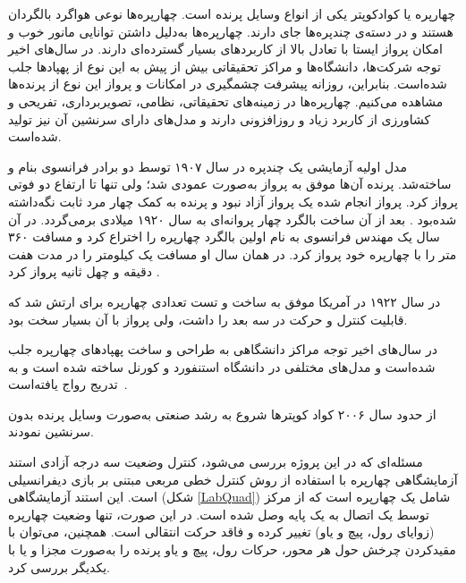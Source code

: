 


چهارپره یا کوادکوپتر یکی از انواع وسایل پرنده است. چهارپره‌ها نوعی هواگرد بالگردان هستند و در دسته‌ی چندپره‌ها جای دارند.
  چهارپره‌ها به‌دلیل داشتن توانایی مانور خوب و امکان پرواز ایستا با تعادل بالا از کاربردهای بسیار گسترده‌ای دارند.
در سال‌های اخیر توجه شرکت‌ها، دانشگاه‌ها و مراکز تحقیقاتی بیش از پیش به این نوع از پهپادها جلب شده‌است. بنابراین، روزانه پیشرفت چشمگیری
 در امکانات و پرواز این نوع از پرنده‌ها مشاهده می‌کنیم. چهارپره‌ها در زمینه‌های تحقیقاتی، نظامی، تصویربرداری، تفریحی و کشاورزی از کاربرد زیاد و روزافزونی دارند و مدل‌های دارای سرنشین آن نیز تولید شده‌است‌.





مدل‬ اولیه آزمایشی یک چندپره در سال ۱۹۰۷ توسط دو برادر فرانسوی بنام
  و 
  ساخته‌شد. پرنده آن‌ها موفق به پرواز به‌صورت عمودی شد؛ ولی تنها تا ارتفاع دو فوتی پرواز کرد. پرواز انجام شده یک پرواز آزاد
  نبود و پرنده به کمک چهار مرد ثابت نگه‌داشته شده‌بود \cite{Sprekelmeyer}.
  بعد از آن ساخت بالگرد چهار پروانه‌ای به سال ۱۹۲۰ میلادی برمی‌گردد. در آن سال یک مهندس فرانسوی به نام  اولین بالگرد چهارپره را اختراع کرد و مسافت ۳۶۰ متر را با چهارپره خود پرواز کرد. در همان سال او مسافت یک کیلومتر را در مدت هفت دقیقه و چهل ثانیه پرواز کرد \cite{10.2307/44729509}.

در  سال ۱۹۲۲ در آمریکا  موفق به ساخت و تست تعدادی چهارپره برای ارتش شد که قابلیت کنترل و حرکت در سه بعد را داشت، ولی پرواز با آن بسیار سخت بود.

در سال‌های اخیر توجه مراکز دانشگاهی به طراحی و ساخت پهپادهای چهارپره جلب شده‌است و مدل‌های مختلفی در دانشگاه استنفورد و کورنل ساخته شده است و به تدریج رواج یافته‌است~\cite{5717652}.

از حدود سال ۲۰۰۶ کواد کوپترها شروع به رشد صنعتی به‌صورت وسایل پرنده بدون سرنشین نمودند.


مسئله‌ای که در این پروژه بررسی می‌شود، کنترل وضعیت سه درجه آزادی استند آزمایشگاهی چهارپره با استفاده از روش کنترل خطی مربعی مبتنی بر بازی دیفرانسیلی است. این استند آزمایشگاهی (شکل \ref{LabQuad}) شامل یک چهارپره است که از 
مرکز توسط یک اتصال به یک پایه وصل شده است. در این صورت، تنها وضعیت چهارپره (زوایای رول، پیچ و یاو) 
 تغییر کرده و فاقد حرکت انتقالی است. همچنین، می‌توان با مقیدکردن چرخش حول هر محور، 
حرکات رول، پیچ و یاو  پرنده را به‌صورت مجزا و یا با یکدیگر بررسی کرد.

